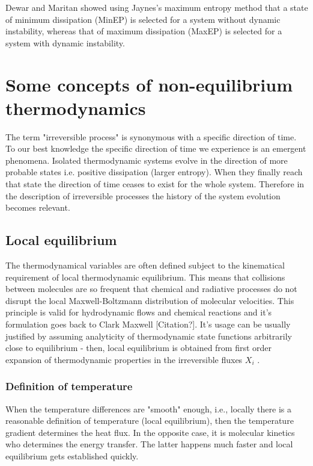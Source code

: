 \documentclass[a4paper,12pt,nofootinbib]{article}
\begin{document}
Dewar and Maritan \cite{Dewar:2014ek} showed using Jaynes's maximum entropy method that a state of minimum dissipation (MinEP) is selected for a system without dynamic instability, whereas that of maximum dissipation (MaxEP) is selected for a system with dynamic instability.

\newpage

\section{Some concepts of non-equilibrium thermodynamics}
The term "irreversible process" is synonymous with a specific direction of time.
To our best knowledge the specific direction of time we experience is an emergent phenomena.
Isolated thermodynamic systems evolve in the direction of more probable states i.e. positive dissipation (larger entropy).
When they finally reach that state the direction of time ceases to exist for the whole system. 
Therefore in the description of irreversible processes the history of the system evolution becomes relevant.


\subsection{Local equilibrium}
The thermodynamical variables are often defined subject to the kinematical requirement of local thermodynamic equilibrium. This means that collisions between molecules are so frequent that chemical and radiative processes do not disrupt the local Maxwell-Boltzmann distribution of molecular velocities. This principle is valid for hydrodynamic flows and chemical reactions and it's formulation goes back to Clark Maxwell [Citation?].
It's usage can be usually justified by assuming analyticity of thermodynamic state functions arbitrarily close to equilibrium - then, local equilibrium is obtained from first order expansion of thermodynamic properties in the irreversible fluxes ${X_i}$ \cite{Evans:2002gg}.

\subsubsection{Definition of temperature}
When the temperature differences are "smooth" enough, i.e., locally there is a reasonable definition of temperature (local equilibrium), then the temperature gradient determines the heat flux. In the opposite case, it is molecular kinetics who determines the energy transfer. The latter happens much faster and local equilibrium gets established quickly.
\end{document}

